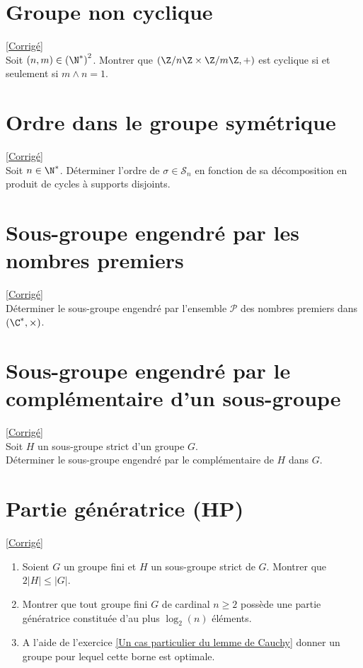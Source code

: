 \documentclass[8pt]{book}
\begin{document}
	\section{Groupe non cyclique }
	\label{Groupe non cyclique}
	\textcolor{blue}{\hyperref[Groupe non cyclique corrigé]{[Corrigé]}}\\
	Soit $(n,m)\in {(\N^*)}^2$. Montrer que $(\Z/n\Z\times\Z/m\Z,+)$ est cyclique si et seulement si $m\land n=1$.
	
	\section{Ordre dans le groupe symétrique }
	\label{Ordre dans le groupe symétrique}
	\textcolor{blue}{\hyperref[Ordre dans le groupe symétrique corrigé]{[Corrigé]}}\\
	Soit $n\in \N^*$. Déterminer l'ordre de $\sigma\in \mathcal S_n$ en fonction de sa décomposition en produit de cycles à supports disjoints.
	
	\section{Sous-groupe engendré par les nombres premiers }
	\label{Sous-groupe engendré par les nombres premiers}
	\textcolor{blue}{\hyperref[Sous-groupe engendré par les nombres premiers corrigé]{[Corrigé]}}\\
	Déterminer le sous-groupe engendré par l'ensemble $\mathcal P$ des nombres premiers dans $(\C^*,\times)$.
	
	\section{Sous-groupe engendré par le complémentaire d'un sous-groupe }
	\label{Sous-groupe engendré par le complémentaire d'un sous-groupe}
	\textcolor{blue}{\hyperref[Sous-groupe engendré par le complémentaire d'un sous-groupe corrigé]{[Corrigé]}}\\
	Soit $H$ un sous-groupe strict d'un groupe $G$.\\
	Déterminer le sous-groupe engendré par le complémentaire de $H$ dans $G$.
	
	\section{Partie génératrice  (HP)}
	\label{Partie génératrice}
	\textcolor{blue}{\hyperref[Partie génératrice corrigé]{[Corrigé]}}\\
	\begin{enumerate}[leftmargin=*]
		\item Soient $G$ un groupe fini et $H$ un sous-groupe strict de $G$. Montrer que $2|H|\leq |G|$.
		\item Montrer que tout groupe fini $G$ de cardinal $n\geq 2$ possède une partie génératrice constituée d’au plus $\log_2(n)$ éléments.
		\item A l'aide de l'exercice \ref{Un cas particulier du lemme de Cauchy} donner un groupe pour lequel cette borne est optimale.
	\end{enumerate}
	
\end{document}
